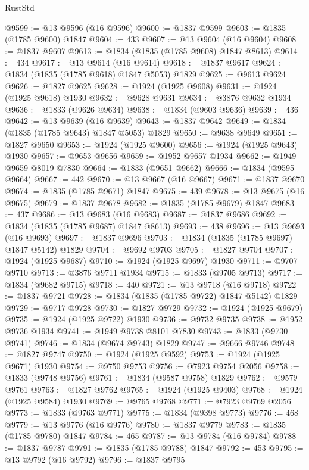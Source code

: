 \begin{lexlean}{RustStd}
\begin{coremodule}
{\begin{coremodule}
{{{{{@9599 := @13 @9596 (@16 @9596)
@9600 := @1837 @9599
@9603 := @1835 (@1785 @9600) @1847
@9604 := 433
@9607 := @13 @9604 (@16 @9604)
@9608 := @1837 @9607
@9613 := @1834 (@1835 (@1785 @9608) @1847 @8613)
@9614 := 434
@9617 := @13 @9614 (@16 @9614)
@9618 := @1837 @9617
@9624 := @1834 (@1835 (@1785 @9618) @1847 @5053) @1829
@9625 := @9613 @9624
@9626 := @1827 @9625
@9628 := @1924 (@1925 @9608)
@9631 := @1924 (@1925 @9618) @1930
@9632 := @9628 @9631
@9634 := @3876 @9632 @1934
@9636 := @1833 (@9626 @9634)
@9638 := @1834 (@9603 @9636)
@9639 := 436
@9642 := @13 @9639 (@16 @9639)
@9643 := @1837 @9642
@9649 := @1834 (@1835 (@1785 @9643) @1847 @5053) @1829
@9650 := @9638 @9649
@9651 := @1827 @9650
@9653 := @1924 (@1925 @9600)
@9656 := @1924 (@1925 @9643) @1930
@9657 := @9653 @9656
@9659 := @1952 @9657 @1934
@9662 := @1949 @9659 @8019 @7830
@9664 := @1833 (@9651 @9662)
@9666 := @1834 (@9595 @9664)
@9667 := 442
@9670 := @13 @9667 (@16 @9667)
@9671 := @1837 @9670
@9674 := @1835 (@1785 @9671) @1847
@9675 := 439
@9678 := @13 @9675 (@16 @9675)
@9679 := @1837 @9678
@9682 := @1835 (@1785 @9679) @1847
@9683 := 437
@9686 := @13 @9683 (@16 @9683)
@9687 := @1837 @9686
@9692 := @1834 (@1835 (@1785 @9687) @1847 @8613)
@9693 := 438
@9696 := @13 @9693 (@16 @9693)
@9697 := @1837 @9696
@9703 := @1834 (@1835 (@1785 @9697) @1847 @5142) @1829
@9704 := @9692 @9703
@9705 := @1827 @9704
@9707 := @1924 (@1925 @9687)
@9710 := @1924 (@1925 @9697) @1930
@9711 := @9707 @9710
@9713 := @3876 @9711 @1934
@9715 := @1833 (@9705 @9713)
@9717 := @1834 (@9682 @9715)
@9718 := 440
@9721 := @13 @9718 (@16 @9718)
@9722 := @1837 @9721
@9728 := @1834 (@1835 (@1785 @9722) @1847 @5142) @1829
@9729 := @9717 @9728
@9730 := @1827 @9729
@9732 := @1924 (@1925 @9679)
@9735 := @1924 (@1925 @9722) @1930
@9736 := @9732 @9735
@9738 := @1952 @9736 @1934
@9741 := @1949 @9738 @8101 @7830
@9743 := @1833 (@9730 @9741)
@9746 := @1834 (@9674 @9743) @1829
@9747 := @9666 @9746
@9748 := @1827 @9747
@9750 := @1924 (@1925 @9592)
@9753 := @1924 (@1925 @9671) @1930
@9754 := @9750 @9753
@9756 := @7923 @9754 @2056
@9758 := @1833 (@9748 @9756)
@9761 := @1834 (@9587 @9758) @1829
@9762 := @9579 @9761
@9763 := @1827 @9762
@9765 := @1924 (@1925 @9403)
@9768 := @1924 (@1925 @9584) @1930
@9769 := @9765 @9768
@9771 := @7923 @9769 @2056
@9773 := @1833 (@9763 @9771)
@9775 := @1834 (@9398 @9773)
@9776 := 468
@9779 := @13 @9776 (@16 @9776)
@9780 := @1837 @9779
@9783 := @1835 (@1785 @9780) @1847
@9784 := 465
@9787 := @13 @9784 (@16 @9784)
@9788 := @1837 @9787
@9791 := @1835 (@1785 @9788) @1847
@9792 := 453
@9795 := @13 @9792 (@16 @9792)
@9796 := @1837 @9795
}}}}}
\end{coremodule}}
\end{coremodule}
\end{lexlean}
